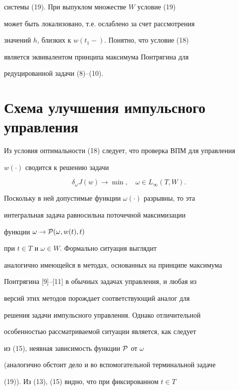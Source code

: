 системы (19). При выпуклом множестве $W$ условие (19) 


может быть локализовано, т.е. ослаблено за счет рассмотрения


значений $h$, близких к $w(t_1-)$. Понятно, что условие (18)


является эквивалентом принципа максимума Понтрягина для 


редуцированной задачи (8)--(10).





\section{Схема улучшения импульсного управления}





Из условия оптимальности (18) следует, что проверка ВПМ для управления


$w(\cdot)$ сводится к решению задачи


\begin{equation}


\delta_\omega J(w) \to \min, \quad \omega \in L_\infty(T,W).


\end{equation}


Поскольку в ней допустимые функции $\omega(\cdot)$ разрывны, то эта


интегральная задача равносильна поточечной максимизации


функции $\omega \to {\cal P}(\omega, w(t),t)$


при $t\in T$ и $\omega \in W$. Формально ситуация выглядит 


аналогично имеющейся в методах, основанных на принципе максимума


Понтрягина [9]--[11] в обычных задачах управления, и любая из


версий этих методов порождает соответствующий аналог для 


решения задачи импульсного управления. Однако отличительной


особенностью рассматриваемой ситуации является, как следует


из (15), неявная зависимость функции $\cal P$ от $\omega$ 


(аналогично обстоит дело и во вспомогательной терминальной задаче


(19)). Из (13), (15) видно, что при фиксированном $t\in T$


